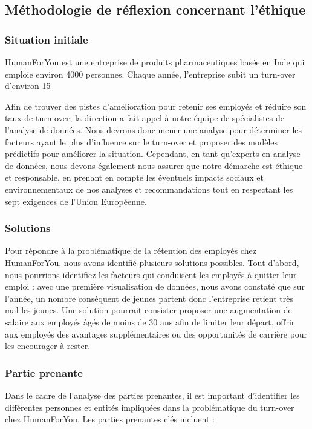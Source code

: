 \subsection{Méthodologie de réflexion concernant l'éthique}
\subsubsection{Situation initiale}
HumanForYou est une entreprise de produits pharmaceutiques basée en Inde qui emploie environ 4000 personnes. Chaque année, l'entreprise subit un turn-over d'environ 15%

Afin de trouver des pistes d'amélioration pour retenir ses employés et réduire son taux de turn-over, la direction a fait appel à notre équipe de spécialistes de l'analyse de données. Nous devrons donc mener une analyse pour déterminer les facteurs ayant le plus d'influence sur le turn-over et proposer des modèles prédictifs pour améliorer la situation. Cependant, en tant qu'experts en analyse de données, nous devons également nous assurer que notre démarche est éthique et responsable, en prenant en compte les éventuels impacts sociaux et environnementaux de nos analyses et recommandations tout en respectant les sept exigences de l'Union Européenne. 

\subsubsection{Solutions}
Pour répondre à la problématique de la rétention des employés chez HumanForYou, nous avons identifié plusieurs solutions possibles. Tout d'abord, nous pourrions identifiez les facteurs qui conduisent les employés à quitter leur emploi : avec une première visualisation de données, nous avons constaté que sur l’année, un nombre conséquent de jeunes partent donc l'entreprise retient très mal les jeunes. Une solution pourrait consister proposer une augmentation de salaire aux employés âgés de moins de 30 ans afin de limiter leur départ, offrir aux employés des avantages supplémentaires ou des opportunités de carrière pour les encourager à rester. 
\newpage
\subsubsection{Partie prenante}
Dans le cadre de l'analyse des parties prenantes, il est important d'identifier les différentes personnes et entités impliquées dans la problématique du turn-over chez HumanForYou. Les parties prenantes clés incluent : 

